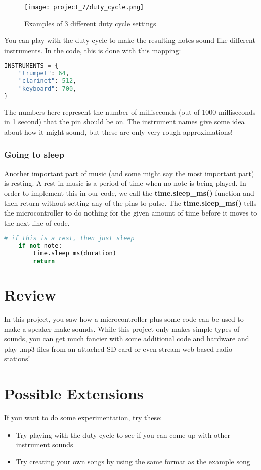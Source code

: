 \begin{figure}[H]
    \centering
    \texttt{[image: project\_7/duty\_cycle.png]}
    \caption{Examples of 3 different duty cycle settings}
\end{figure}

You can play with the duty cycle to make the resulting notes sound like different instruments.
In the code, this is done with this mapping:

\begin{lstlisting}[language=Python,caption=Instrument names mapped to duty cycle settings]
INSTRUMENTS = {
    "trumpet": 64,
    "clarinet": 512,
    "keyboard": 700,
}
\end{lstlisting}

The numbers here represent the number of milliseconds (out of 1000 milliseconds in 1 second)
that the pin should be on. The instrument names give some idea about how it might sound, but
these are only very rough approximations!

\subsubsection{Going to sleep}

Another important part of music (and some might say the most important part) is resting.
A rest in music is a period of time when no note is being played. In order to implement
this in our code, we call the \textbf{time.sleep\_ms()} function and then return without
setting any of the pins to pulse. The \textbf{time.sleep\_ms()} tells the microcontroller to
do nothing for the given amount of time before it moves to the next line of code.

\begin{lstlisting}[language=Python,caption=Using the sleep function]
    # if this is a rest, then just sleep
    if not note:
        time.sleep_ms(duration)
        return
\end{lstlisting}


\section{Review}

In this project, you saw how a microcontroller plus some code can be used to make
a speaker make sounds. While this project only makes simple types of sounds, you
can get much fancier with some additional code and hardware and play .mp3 files
from an attached SD card or even stream web-based radio stations!

\section{Possible Extensions}
If you want to do some experimentation, try these:

\begin{itemize}
    \item Try playing with the duty cycle to see if you can come up with other instrument sounds
    \item Try creating your own songs by using the same format as the example song
\end{itemize}
